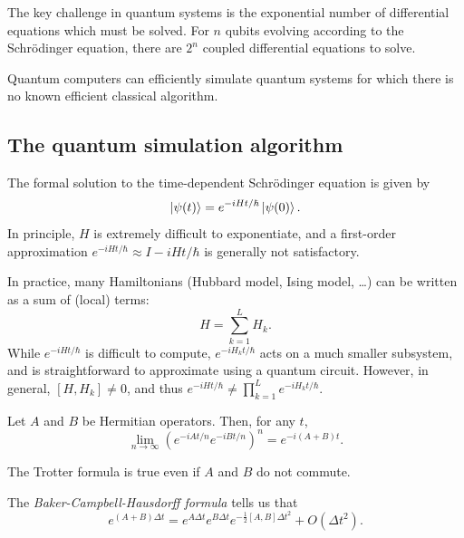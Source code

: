 The key challenge in quantum systems is the exponential number of differential equations which must be solved.
For $n$ qubits evolving according to the Schrödinger equation, there are $2^n$ coupled differential equations to solve.

Quantum computers can efficiently simulate quantum systems for which there is no known efficient classical algorithm.

\subsection{The quantum simulation algorithm}
The formal solution to the time-dependent Schrödinger equation is given by
\[
    \ket{\psi(t)} = e^{-iHt/\hbar}\ket{\psi(0)}.
\]
In principle, $H$ is extremely difficult to exponentiate,
and a first-order approximation $e^{-iHt/\hbar} \approx I - iHt/\hbar$ is generally not satisfactory.

In practice, many Hamiltonians (Hubbard model, Ising model, \dots) can be written as a sum of (local) terms:
\[
    H = \sum_{k=1}^L H_k.
\]
While $e^{-iHt/\hbar}$ is difficult to compute, $e^{-iH_k t/\hbar}$ acts on a much smaller subsystem,
and is straightforward to approximate using a quantum circuit.
However, in general, $[H, H_k] \neq 0$, and thus $e^{-iHt/\hbar} \neq \prod_{k=1}^L e^{-iH_k t/\hbar}$.

\begin{theorem}
    Let $A$ and $B$ be Hermitian operators.
    Then, for any $t$,
    \[
        \lim_{n \to \infty} \left(e^{-iAt/n}e^{-iBt/n}\right)^n = e^{-i(A+B)t}.
    \]
\end{theorem}
The Trotter formula is true even if $A$ and $B$ do not commute.

The \emph{Baker-Campbell-Hausdorff formula} tells us that
\[
    e^{(A+B)\Delta t} = e^{A\Delta t}e^{B\Delta t}e^{-\frac{1}{2}[A, B]\Delta t^2} + O(\Delta t^2).
\]

